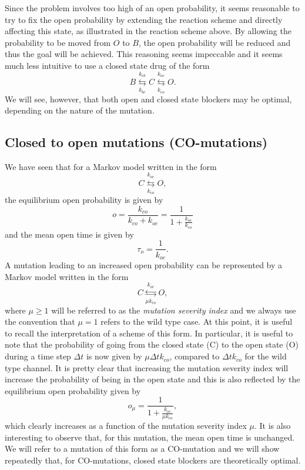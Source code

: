 Since the problem involves too high of an open probability, it seems reasonable to try to fix the open probability by extending the reaction scheme and directly affecting this state, as illustrated in the reaction scheme above. By allowing the probability to be moved from $O$ to $B$, the open probability will be reduced and thus the goal will be achieved. This reasoning seems impeccable and it seems much less intuitive to use a closed state drug of the form
\begin{equation}
B\underset{k_{bc}}{\overset{k_{cb}}{\leftrightarrows}}C\underset{
k_{co}}{\overset{k_{oc}}{\leftrightarrows}}O. \label{closed_block}
\end{equation}
We will see, however, that both open and closed state blockers may be optimal, depending on the nature of the mutation.

\subsection{Closed to open mutations (CO-mutations) \label{com}}
We have seen that for a Markov model written in the form
\begin{equation}
C\underset{ k_{co}}{\overset{k_{oc}}{\leftrightarrows}}O,
\end{equation}
 the equilibrium open probability is given by
\[ o=\frac{k_{co}}{k_{co}+k_{oc}}=\frac{1}{1+\frac{k_{oc}}{k_{co}}} \]
and the mean open time is given by
\[ \tau_o=\frac{1}{k_{oc}}. \]
A mutation leading to an increased open probability can be represented by a Markov model written in the form
\begin{equation}
C\underset{ \mu k_{co}}{\overset{k_{oc}}{\leftrightarrows}}O,
\end{equation}
where $\mu \ge 1$ will be referred to as the {\it mutation severity index} and we always use the convention that $\mu=1$ refers to the wild type case. At this point, it is useful to recall the interpretation of a scheme of this form. In particular, it is useful to note that the probability of going from the closed state (C) to the open state (O) during a time step $\Delta t$ is now given 
by $\mu \Delta t k_{co}$, compared to $\Delta t k_{co}$ for the wild type channel. It is pretty clear that increasing the mutation severity index will increase the probability of being in the open state and this is also reflected by the equilibrium open probability given by
\[o_\mu=\frac{1}{1+\frac{k_{oc}}{\mu k_{co}}}, \]
which clearly increases as a function of the mutation severity index $\mu$. 
It is also interesting to observe that, for this mutation, the mean open time is unchanged. We will refer to a mutation of this form as a CO-mutation and we will show repeatedly that, for CO-mutations, closed state blockers are theoretically optimal.

